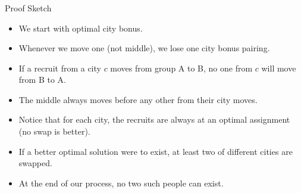 \begin{frame}
    \frametitle{\problemtitle}
    \begin{block}{Proof Sketch}
        \begin{itemize}
            \item We start with optimal city bonus.
            \item Whenever we move one (not middle), we lose one city bonus pairing.
            \pause
            \vspace{0.2cm}
            \item If a recruit from a city $c$ moves from group A to B, no one from $c$ will move from B to A.
            \item The middle always moves before any other from their city moves.
            \item Notice that for each city, the recruits are always at an optimal assignment (no swap is better).
            \item If a better optimal solution were to exist, at least two of different cities are swapped.
            \item At the end of our process, no two such people can exist.
        \end{itemize}
    \end{block}
\end{frame}
